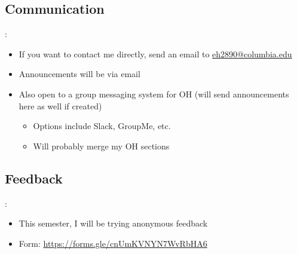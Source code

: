 \documentclass{../slides}
\begin{document}
\subsection{Communication}
\begin{frame}{\secname: \subsecname}
    \begin{itemize}
        \item If you want to contact me directly, send an email to \href{mailto:eh2890@columbia.edu}{eh2890@columbia.edu}
        \item Announcements will be via email
        \item Also open to a group messaging system for OH (will send announcements here as well if created)
        \begin{itemize}
            \item Options include Slack, GroupMe, etc.
            \item Will probably merge my OH sections
        \end{itemize}
    \end{itemize}
\end{frame}

\subsection{Feedback}
\begin{frame}{\secname: \subsecname}
    \begin{itemize}
        \item This semester, I will be trying anonymous feedback
        \item Form: \url{https://forms.gle/cnUmKVNYN7WvRbHA6}
    \end{itemize}
\end{frame}
\end{document}

